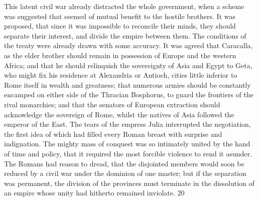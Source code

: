 This latent civil war already distracted the whole government,
when a scheme was suggested that seemed of mutual benefit to the
hostile brothers. It was proposed, that since it was impossible
to reconcile their minds, they should separate their interest,
and divide the empire between them. The conditions of the treaty
were already drawn with some accuracy. It was agreed that
Caracalla, as the elder brother should remain in possession of
Europe and the western Africa; and that he should relinquish the
sovereignty of Asia and Egypt to Geta, who might fix his
residence at Alexandria or Antioch, cities little inferior to
Rome itself in wealth and greatness; that numerous armies should
be constantly encamped on either side of the Thracian Bosphorus,
to guard the frontiers of the rival monarchies; and that the
senators of European extraction should acknowledge the sovereign
of Rome, whilst the natives of Asia followed the emperor of the
East. The tears of the empress Julia interrupted the negotiation,
the first idea of which had filled every Roman breast with
surprise and indignation. The mighty mass of conquest was so
intimately united by the hand of time and policy, that it
required the most forcible violence to rend it asunder. The
Romans had reason to dread, that the disjointed members would
soon be reduced by a civil war under the dominion of one master;
but if the separation was permanent, the division of the
provinces must terminate in the dissolution of an empire whose
unity had hitherto remained inviolate. 20


